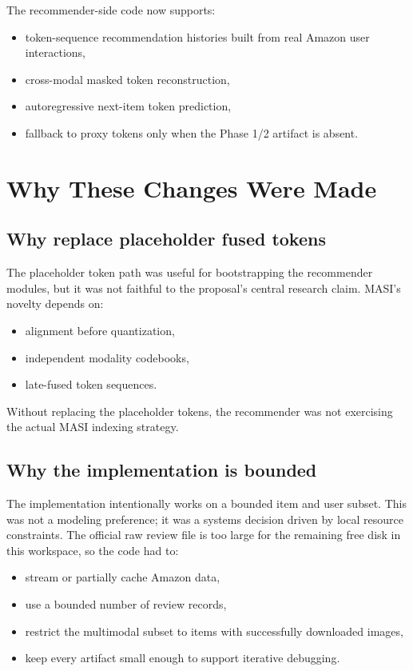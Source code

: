 \documentclass[11pt]{article}
\begin{document}
The recommender-side code now supports:
\begin{itemize}[leftmargin=1.5em]
    \item token-sequence recommendation histories built from real Amazon user interactions,
    \item cross-modal masked token reconstruction,
    \item autoregressive next-item token prediction,
    \item fallback to proxy tokens only when the Phase 1/2 artifact is absent.
\end{itemize}

\section{Why These Changes Were Made}
\subsection{Why replace placeholder fused tokens}
The placeholder token path was useful for bootstrapping the recommender modules, but it was not faithful to the proposal's central research claim. MASI's novelty depends on:
\begin{itemize}[leftmargin=1.5em]
    \item alignment before quantization,
    \item independent modality codebooks,
    \item late-fused token sequences.
\end{itemize}

Without replacing the placeholder tokens, the recommender was not exercising the actual MASI indexing strategy.

\subsection{Why the implementation is bounded}
The implementation intentionally works on a bounded item and user subset. This was not a modeling preference; it was a systems decision driven by local resource constraints. The official raw review file is too large for the remaining free disk in this workspace, so the code had to:
\begin{itemize}[leftmargin=1.5em]
    \item stream or partially cache Amazon data,
    \item use a bounded number of review records,
    \item restrict the multimodal subset to items with successfully downloaded images,
    \item keep every artifact small enough to support iterative debugging.
\end{itemize}
\end{document}
